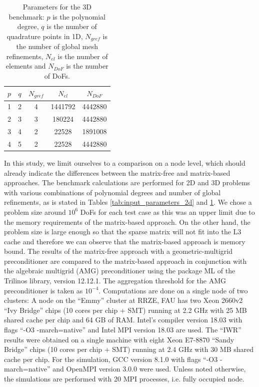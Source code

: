 \documentclass[times,doublespace]{nmeauth}
\begin{document}
\begin{table}
  \centering
  \begin{tabular}{ccccc}
  \hline
    $p$ & $q$ & $N_{gref}$ & $N_{el}$ & $N_{DoF}$ \\
  \hline
    1 & 2 & 4 & 1441792 & 4442880 \\
    2 & 3 & 3 & 180224 & 4442880 \\
    3 & 4 & 2 & 22528 & 1891008 \\
    4 & 5 & 2 & 22528 & 4442880 \\
  \hline
  \end{tabular}
  \caption{Parameters for the 3D benchmark: $p$ is the polynomial degree,
  $q$ is the number of quadrature points in 1D, $N_{gref}$ is the number of global mesh refinements, $N_{el}$ is the number of elements and $N_{DoF}$ is the number of DoFs.
  }
  \label{tab:input_parameters_3d}
\end{table}

{\color{red}In this study, we limit ourselves to a comparison on a node level, which should already indicate the differences between the matrix-free and matrix-based approaches.}
The benchmark calculations are performed for 2D and 3D problems with various combinations of polynomial degrees and number of global refinements, as is stated in Tables \ref{tab:input_parameters_2d} and \ref{tab:input_parameters_3d}.
{\color{red}
We chose a problem size around $10^6$ DoFs for each test case as this was an upper limit due to the memory requirements of the matrix-based approach.
On the other hand, the problem size is large enough so that the sparse matrix will not fit into the L3 cache and therefore we can observe that the matrix-based approach is memory bound.
}
%
The results of the matrix-free approach with a geometric-multigrid preconditioner are compared to the matrix-based approach in conjunction with the algebraic multigrid (AMG) preconditioner using the package ML of the Trilinos \cite{Heroux2005} library, version 12.12.1.
The aggregation threshold for the AMG preconditioner is taken as $10^{-4}$.
Computations are done on a single node of two clusters:
A node on the ``Emmy'' cluster at RRZE, FAU has two Xeon 2660v2 ``Ivy Bridge'' chips (10 cores per chip + SMT) running at 2.2 GHz with 25 MB shared cache per chip and 64 GB of RAM. Intel's compiler version 18.03 with flags ``-O3 -march=native'' and Intel MPI version 18.03 are used.
The ``IWR'' results were obtained on a single machine with eight Xeon E7-8870 ``Sandy Bridge'' chips (10 cores per chip  + SMT) running at 2.4 GHz with 30 MB shared cache per chip. For the simulation, GCC version 8.1.0 with flags ``-O3 -march=native'' and OpenMPI version 3.0.0 were used.
{\color{red}Unless noted otherwise, the simulations are performed with 20 MPI processes, i.e. fully occupied node.}
\end{document}
